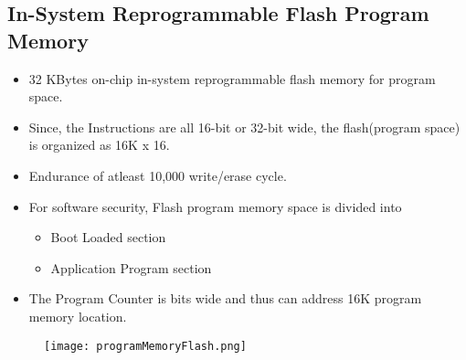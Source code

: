 \documentclass{article}
\begin{document}
\subsection{In-System Reprogrammable Flash Program Memory}
\begin{itemize}
    \item 32 KBytes on-chip in-system reprogrammable flash memory for program space.
    \item Since, the Instructions are all 16-bit or  32-bit wide, the flash(program space) is organized as 16K x 16.
    \item Endurance of atleast 10,000 write/erase cycle.
    \item For software security, Flash program memory space is divided into
    \begin{itemize}
        \item Boot Loaded section
        \item Application Program section
    \end{itemize}
    \item The Program Counter is bits wide and thus can address 16K program memory location.\end{itemize}

\begin{figure}[H]
    \begin{center}
        \texttt{[image: programMemoryFlash.png]}
    \end{center}
\end{figure}
\end{document}

